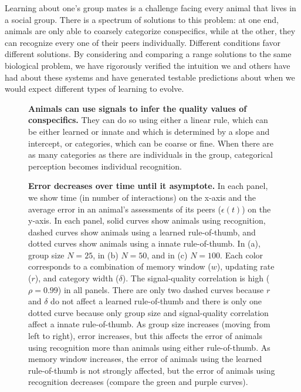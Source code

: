 Learning about one's group mates is a challenge facing every animal that lives in a social group. There is a spectrum of solutions to this problem: at one end, animals are only able to coarsely categorize conspecifics, while at the other, they can recognize every one of their peers individually. Different conditions favor different solutions. By considering and comparing a range solutions to the same biological problem, we have rigorously verified the intuition we and others have had about these systems and have generated testable predictions about when we would expect different types of learning to evolve. 
  

\newpage



\newpage

\begin{figure}
\caption{\label{schematic}\sffamily\small\textbf{Animals can use signals to infer the quality values of conspecifics.} They can do so using either a linear rule, which can be either learned or innate and which is determined by a slope and intercept, or categories, which can be coarse or fine. When there are as many categories as there are individuals in the group, categorical perception becomes individual recognition.}
\end{figure}

\begin{figure}
\caption{\label{learning_curves} \sffamily\small\textbf{Error decreases over time until it  asymptote.}
In each panel, we show time (in number of interactions) on the x-axis and the average error in an animal's assessments of its peers ($\epsilon(t)$) on the y-axis. In each panel, solid curves show animals using recognition, dashed curves show animals using a learned rule-of-thumb, and dotted curves show animals using a innate rule-of-thumb. In (a), group size $N=25$, in (b) $N=50$, and in (c) $N=100$. Each color corresponds to a combination of memory window ($w$), updating rate ($r$), and category width ($\delta$). The signal-quality correlation is high ($\rho=0.99$) in all panels. There are only two dashed curves because $r$ and $\delta$ do not affect a learned rule-of-thumb and there is only one dotted curve because only group size and signal-quality correlation affect a innate rule-of-thumb. As group size increases (moving from left to right), error increases, but this affects the error of animals using recognition more than animals using either rule-of-thumb. As memory window increases, the error of animals using the learned rule-of-thumb is not strongly affected, but the error of animals using recognition decreases (compare the green and purple curves).}
\end{figure}


